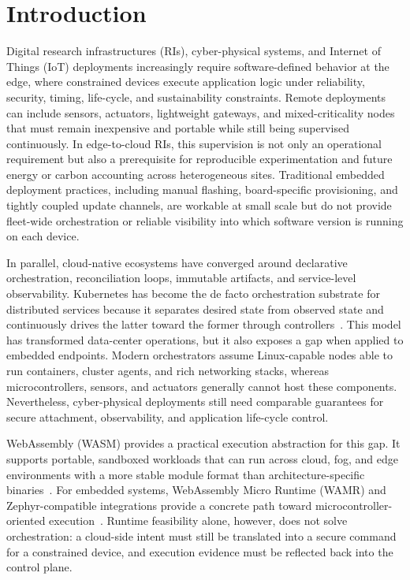 \section{Introduction}\label{sec:introduction}

{\color{red}Digital research infrastructures (RIs), cyber-physical systems, and Internet of Things (IoT) deployments increasingly require software-defined behavior at the edge, where constrained devices execute application logic under reliability, security, timing, life-cycle, and sustainability constraints.} Remote deployments can include sensors, actuators, lightweight gateways, and mixed-criticality nodes that must remain inexpensive and portable while still being supervised continuously. In edge-to-cloud RIs, this supervision is not only an operational requirement but also a prerequisite for reproducible experimentation and future energy or carbon accounting across heterogeneous sites. Traditional embedded deployment practices, including manual flashing, board-specific provisioning, and tightly coupled update channels, are workable at small scale but do not provide fleet-wide orchestration or reliable visibility into which software version is running on each device.

In parallel, cloud-native ecosystems have converged around declarative orchestration, reconciliation loops, immutable artifacts, and service-level observability. Kubernetes has become the de facto orchestration substrate for distributed services because it separates desired state from observed state and continuously drives the latter toward the former through controllers~\cite{kubernetes}. This model has transformed data-center operations, but it also exposes a gap when applied to embedded endpoints. Modern orchestrators assume Linux-capable nodes able to run containers, cluster agents, and rich networking stacks, whereas microcontrollers, sensors, and actuators generally cannot host these components. Nevertheless, cyber-physical deployments still need comparable guarantees for secure attachment, observability, and application life-cycle control.

WebAssembly (WASM) provides a practical execution abstraction for this gap. It supports portable, sandboxed workloads that can run across cloud, fog, and edge environments with a more stable module format than architecture-specific binaries~\cite{haas_wasm}. For embedded systems, WebAssembly Micro Runtime (WAMR) and Zephyr-compatible integrations provide a concrete path toward microcontroller-oriented execution~\cite{wamr,zephyr}. Runtime feasibility alone, however, does not solve orchestration: a cloud-side intent must still be translated into a secure command for a constrained device, and execution evidence must be reflected back into the control plane.

